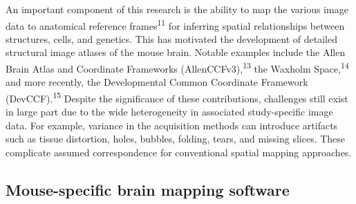 \documentclass[
  12pt,
]{article}
\begin{document}
An important component of this research is the ability to map the
various image data to anatomical reference frames\textsuperscript{11}
for inferring spatial relationships between structures, cells, and
genetics. This has motivated the development of detailed structural
image atlases of the mouse brain. Notable examples include the Allen
Brain Atlas and Coordinate Frameworks (AllenCCFv3),\textsuperscript{13}
the Waxholm Space,\textsuperscript{14} and more recently, the
Developmental Common Coordinate Framework (DevCCF).\textsuperscript{15}
Despite the significance of these contributions, challenges still exist
in large part due to the wide heterogeneity in associated study-specific
image data. For example, variance in the acquisition methods can
introduce artifacts such as tissue distortion, holes, bubbles, folding,
tears, and missing slices. These complicate assumed correspondence for
conventional spatial mapping approaches.

\hypertarget{mouse-specific-brain-mapping-software}{%
\subsection{Mouse-specific brain mapping
software}\label{mouse-specific-brain-mapping-software}}
\end{document}
